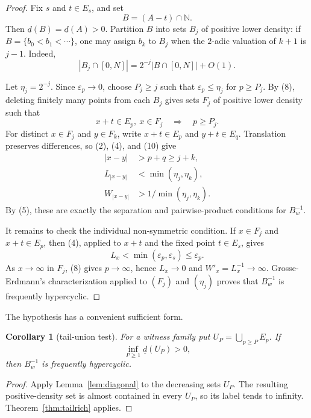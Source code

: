\documentclass[11pt]{article}
\newtheorem{corollary}[theorem]{Corollary}
\newcommand{\N}{\mathbb N}
\newcommand{\ud}{\underline d}
\begin{document}
\begin{proof}
Fix $s$ and $t\in E_s$, and set
\[
                         B=(A-t)\cap\N.
\]
Then $\ud(B)=\ud(A)>0$.  Partition $B$ into sets $B_j$ of positive lower
density: if $B=\{b_0<b_1<\cdots\}$, one may assign $b_k$ to $B_j$ when
the $2$-adic valuation of $k+1$ is $j-1$.  Indeed,
\[
 |B_j\cap[0,N]|=2^{-j}|B\cap[0,N]|+O(1).                               \tag{9}
\]

Let $\eta_j=2^{-j}$.  Since $\varepsilon_p\to0$, choose $P_j\geq j$ such
that $\varepsilon_p\leq\eta_j$ for $p\geq P_j$.  By (8), deleting finitely
many points from each $B_j$ gives sets $F_j$ of positive lower density such
that
\[
             x+t\in E_p,\ x\in F_j\quad\Longrightarrow\quad p\geq P_j.
                                                                            \tag{10}
\]
For distinct $x\in F_j$ and $y\in F_k$, write
$x+t\in E_p$ and $y+t\in E_q$.  Translation preserves differences, so
(2), (4), and (10) give
\begin{align*}
 |x-y|&>p+q\geq j+k,\\
 L_{|x-y|}&<\min(\eta_j,\eta_k),\\
 W_{|x-y|}&>1/\min(\eta_j,\eta_k).
\end{align*}
By (5), these are exactly the separation and pairwise-product conditions for
$B_w^{-1}$.

It remains to check the individual non-symmetric condition.  If $x\in F_j$
and $x+t\in E_p$, then (4), applied to $x+t$ and the fixed point $t\in E_s$,
gives
\[
             L_x<\min(\varepsilon_p,\varepsilon_s)\leq\varepsilon_p.
\]
As $x\to\infty$ in $F_j$, (8) gives $p\to\infty$, hence $L_x\to0$ and
$W'_x=L_x^{-1}\to\infty$.  Grosse-Erdmann's characterization applied to
$(F_j)$ and $(\eta_j)$ proves that $B_w^{-1}$ is frequently hypercyclic.
\end{proof}

The hypothesis has a convenient sufficient form.

\begin{corollary}[tail-union test]\label{cor:tailunion}
For a witness family put $U_P=\bigcup_{p\geq P}E_p$.  If
\[
                         \inf_{P\geq1}\ud(U_P)>0,                       \tag{11}
\]
then $B_w^{-1}$ is frequently hypercyclic.
\end{corollary}

\begin{proof}
Apply Lemma~\ref{lem:diagonal} to the decreasing sets $U_P$.  The resulting
positive-density set is almost contained in every $U_P$, so its label tends
to infinity.  Theorem~\ref{thm:tailrich} applies.
\end{proof}
\end{document}
